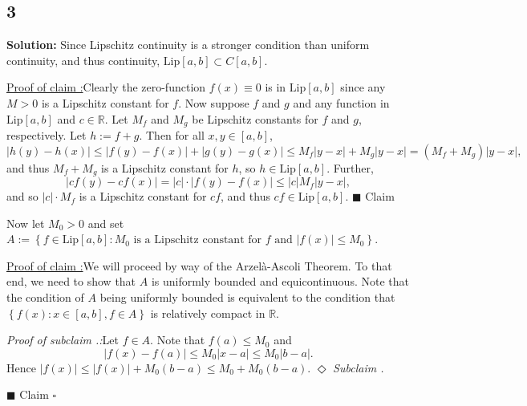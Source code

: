 \documentclass[12pt]{article}
\newcounter{ProofCounter}
\newcounter{ClaimCounter}[ProofCounter]
\newcounter{SubClaimCounter}[ClaimCounter]
\newenvironment{Solution}{\stepcounter{ProofCounter}\textbf{Solution:}}{\hfill$\square$}
\newenvironment{claim}[1]{\vspace{1mm}\stepcounter{ClaimCounter}\par\noindent\underline{\bf Claim \theClaimCounter:}\space#1}{}
\newenvironment{claimproof}[1]{\par\noindent\underline{Proof of claim \theClaimCounter:}\space#1}{\hfill $\blacksquare$ Claim \theClaimCounter}
\newenvironment{subclaim}[1]{\stepcounter{SubClaimCounter}\par\noindent\emph{Subclaim \theClaimCounter.\theSubClaimCounter:}\space#1}{}
\newenvironment{subclaimproof}[1]{\par\noindent\emph{Proof of subclaim \theClaimCounter.\theSubClaimCounter:}\space#1}{\hfill
$\Diamond$ \emph{Subclaim \theClaimCounter.\theSubClaimCounter}}
\begin{document}
\subsection*{3}
\begin{Solution}
  Since Lipschitz continuity is a stronger condition than uniform continuity, and thus continuity, $\text{Lip}[a,b] \subset C[a,b]$. 

  \begin{claimproof}
    Clearly the zero-function $f(x) \equiv 0$ is in $\text{Lip}[a,b]$ since any $M > 0$ is a Lipschitz constant for $f$. Now suppose $f$ and $g$ and
    any function in $\text{Lip}[a,b]$ and $c \in \mathbb{R}$. Let $M_f$ and $M_g$ be Lipschitz constants for $f$ and $g$, respectively. Let $h := f +
    g$. Then for all
    $x, y \in [a,b]$,
    \[
      |h(y) - h(x)| \leq |f(y) - f(x)| + |g(y) - g(x)| \leq M_f |y - x| + M_g |y - x| = (M_f + M_g) |y - x|,
    \]
    and thus $M_f + M_g$ is a Lipschitz constant for $h$, so $h \in \text{Lip}[a,b]$. Further,
    \[
      |cf(y) - cf(x)| = |c| \cdot |f(y) - f(x)| \leq |c| M_f |y - x|,
    \]
    and so $|c|\cdot M_f$ is a Lipschitz constant for $cf$, and thus $cf \in \text{Lip}[a,b]$.
  \end{claimproof}

  Now let $M_0 > 0$ and set $A := \left\{ f \in \text{Lip}[a,b] : M_0\text{ is a Lipschitz constant for $f$ and }|f(x)| \leq M_0 \right\}$.

  \begin{claimproof}
    We will proceed by way of the Arzel{\`a}-Ascoli Theorem. To that end, we need to show that $A$ is uniformly bounded and equicontinuous. Note that the
    condition of $A$ being uniformly bounded is equivalent to the condition that $\left\{ f(x) : x \in [a,b], f \in A \right\}$ is relatively compact
    in $\mathbb{R}$.

    \begin{subclaimproof}
      Let $f \in A$. Note that $f(a) \leq M_0$ and 
      \[
        |f(x) - f(a)| \leq M_0 |x - a| \leq M_0 |b - a|. 
      \]
      Hence $|f(x)| \leq |f(x)| + M_0(b - a) \leq M_0 + M_0(b-a)$.
    \end{subclaimproof}


\end{claimproof}
\end{Solution}
\end{document}

